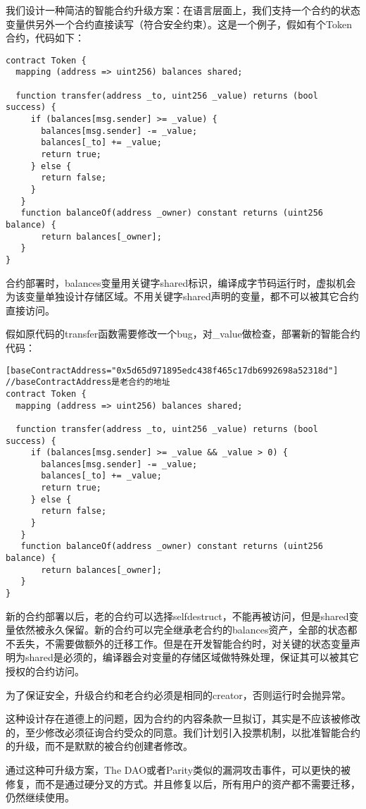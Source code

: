 我们设计一种简洁的智能合约升级方案：在语言层面上，我们支持一个合约的状态变量供另外一个合约直接读写（符合安全约束）。这是一个例子，假如有个Token合约，代码如下：
\begin{lstlisting}[frame=single]
contract Token {
  mapping (address => uint256) balances shared;

  function transfer(address _to, uint256 _value) returns (bool success) {
     if (balances[msg.sender] >= _value) {
       balances[msg.sender] -= _value;
       balances[_to] += _value;
       return true;
     } else {
       return false;
     }
   }
   function balanceOf(address _owner) constant returns (uint256 balance) {
       return balances[_owner];
   }
}
\end{lstlisting}

合约部署时，balances变量用关键字shared标识，编译成字节码运行时，虚拟机会为该变量单独设计存储区域。不用关键字shared声明的变量，都不可以被其它合约直接访问。

假如原代码的transfer函数需要修改一个bug，对\_value做检查，部署新的智能合约代码：

\begin{lstlisting}[frame=single]
[baseContractAddress="0x5d65d971895edc438f465c17db6992698a52318d"]
//baseContractAddress是老合约的地址
contract Token {
  mapping (address => uint256) balances shared;

  function transfer(address _to, uint256 _value) returns (bool success) {
     if (balances[msg.sender] >= _value && _value > 0) {
       balances[msg.sender] -= _value;
       balances[_to] += _value;
       return true;
     } else {
       return false;
     }
   }
   function balanceOf(address _owner) constant returns (uint256 balance) {
       return balances[_owner];
   }
}
\end{lstlisting}

新的合约部署以后，老的合约可以选择selfdestruct，不能再被访问，但是shared变量依然被永久保留。新的合约可以完全继承老合约的balances资产，全部的状态都不丢失，不需要做额外的迁移工作。但是在开发智能合约时，对关键的状态变量声明为shared是必须的，编译器会对变量的存储区域做特殊处理，保证其可以被其它授权的合约访问。

为了保证安全，升级合约和老合约必须是相同的creator，否则运行时会抛异常。

这种设计存在道德上的问题，因为合约的内容条款一旦拟订，其实是不应该被修改的，至少修改必须征询合约受众的同意。我们计划引入投票机制，以批准智能合约的升级，而不是默默的被合约创建者修改。

通过这种可升级方案，The DAO或者Parity类似的漏洞攻击事件，可以更快的被修复，而不是通过硬分叉的方式。并且修复以后，所有用户的资产都不需要迁移，仍然继续使用。


